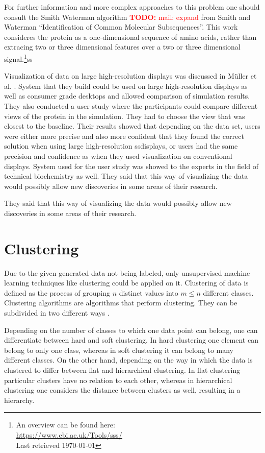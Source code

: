 \documentclass[journal]{vgtc}       %
\newcommand{\todo}[1]{\textcolor{red}{\textbf{TODO:} #1}}
\begin{document}
For further information and more complex approaches to this problem one should consult the Smith Waterman algorithm \todo{mail: expand} from Smith and Waterman ``Identification of Common Molecular Subsequences''\cite{smithwater}. This work consideres the protein as a one-dimensional sequence of amino acids, rather than extracing two or three dimensional features over a two or three dimensional signal.\footnote{An overview can be found here: \\ \url{https://www.ebi.ac.uk/Tools/sss/}\\ Last retrieved \today}ss

Visualization of data on large high-resolution displays was discussed in Müller et al. \cite{powerwall}. System that they build could be used on large high-resolution displays as well as consumer grade desktops and allowed comparison of simulation results. They also conducted a user study where the participants could compare different views of the protein in the simulation. They had to choose the view that was closest to the baseline. Their results showed that depending on the data set, users were either more precise and also more confident that they found the correct solution when using large high-resolution ssdisplays, or users had the same precision and confidence as when they used visualization on conventional displays. System used for the user study was showed to the experts in the field of technical biochemistry as well. They said that this way of visualizing the data would possibly allow new discoveries in some areas of their research.

They said that this way of visualizing the data would possibly allow new discoveries in some areas of their research.

\section{Clustering}

Due to the given generated data  not being  labeled, only unsupervised machine learning techniques like clustering could be applied on it. 
Clustering of data is defined as the process of grouping $n$ distinct values into $m \leq n$ different classes. Clustering algorithms are algorithms that perform clustering. They can be subdivided in two different ways \cite{iir}.

Depending on the number of classes to which one data point can belong, one can differentiate  between hard and soft clustering. In hard clustering one element can belong to only one class, whereas in soft clustering it can belong to many different classes.
On the other hand, depending on the way in which the data is clustered to  differ between flat and hierarchical clustering. In flat clustering particular clusters have no relation to each other, whereas in hierarchical clustering one considers the distance between clusters as well, resulting in a hierarchy.
\end{document}

